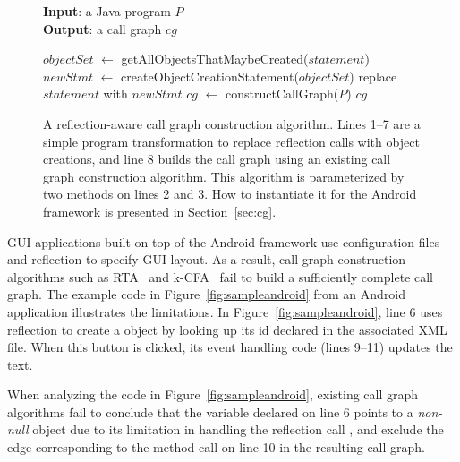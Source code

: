 \begin{figure}[t]
\textbf{Input}: a Java program $\mathit{P}$\\
\textbf{Output}: a call graph $\mathit{cg}$\\
\vspace{-5mm}
\begin{algorithmic}[1]
\STATE $\mathit{objectSet}$ $\leftarrow$ getAllObjectsThatMaybeCreated($\mathit{statement}$)
\STATE $\mathit{newStmt}$ $\leftarrow$ createObjectCreationStatement($\mathit{objectSet}$)
\STATE replace $\mathit{statement}$ with $\mathit{newStmt}$
\ENDIF
\ENDFOR
\STATE $\mathit{cg}$ $\leftarrow$ constructCallGraph($\mathit{P}$)
\RETURN $\mathit{cg}$
\end{algorithmic}
\vspace{-3mm}
\caption{A reflection-aware call graph construction algorithm. Lines
1--7 are a simple program transformation to replace reflection calls
with object creations, and line 8 builds the call graph using
an existing call graph construction algorithm. This algorithm
is parameterized by two methods on lines 2 and 3. 
How to instantiate it for the Android framework is presented in Section~\ref{sec:cg}.
} 
\label{fig:cgalgorithm}
\end{figure}

GUI applications built on top of the Android framework
use configuration files and reflection to specify GUI layout.
As a result, call graph construction algorithms such as RTA~\cite{rta}
and k-CFA~\cite{kcfa} fail to build a sufficiently complete call graph.
The example code in Figure~\ref{fig:sampleandroid} from an Android application
 illustrates the limitations.
In Figure~\ref{fig:sampleandroid}, line 6 uses reflection to create a 
object by looking up its id declared in the associated XML file. When this button
is clicked, its event handling code (lines 9--11) updates the text.

When analyzing the code in Figure~\ref{fig:sampleandroid}, existing call graph algorithms
fail to conclude that the variable  declared on line 6
points to a \textit{non-null}  object due to its limitation in handling the
reflection call , and exclude the edge
corresponding to the  method call on line 10 in the resulting call graph. 

